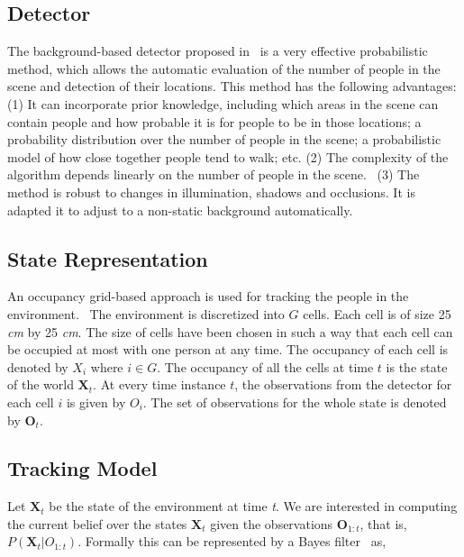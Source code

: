 \subsection{Detector}
The background-based detector proposed in~\cite{englebienne-bnaic} is a very effective probabilistic method, which allows the automatic evaluation of the number of people in the scene and detection of their locations. This method has the following advantages: (1) It can incorporate prior knowledge, including which areas in the scene can contain people and how probable it is for people to be in those locations; a probability distribution over the number of people in the scene; a probabilistic model of how close
together people tend to walk; etc. (2) The complexity of the algorithm depends linearly on the number of people in the scene.%
~(3) The method is robust to changes in illumination, shadows and occlusions. It is adapted it to adjust to a non-static background automatically.

\subsection{State Representation}

An occupancy grid-based approach is used for tracking the people in the environment.%
~The environment is discretized into $G$ cells. Each cell is of size 25 \textit{cm} by 25 \textit{cm}. The size of cells have been chosen in such a way that each cell can be occupied at most with one person at any time. The occupancy of each cell is denoted by $X_{i}$ where $i \in G$. The occupancy of all the cells at time $t$ is the state of the world $\textbf{X}_{t}$. At every time instance $t$, the observations from the detector for each cell $i$ is given by $O_{i}$. The set of observations for the whole state is denoted by $\textbf{O}_{t}$. 

\subsection{Tracking Model}

Let $\textbf{X}_{t}$ be the state of the environment at time \textit{t}. We are interested in computing the current belief over the states $\textbf{X}_{t}$ given the observations $\textbf{O}_{1:t}$, that is, $P(\textbf{X}_{t}|O_{1:t})$. Formally this can be represented by a Bayes filter~\cite{khan2004mcmc} as,

